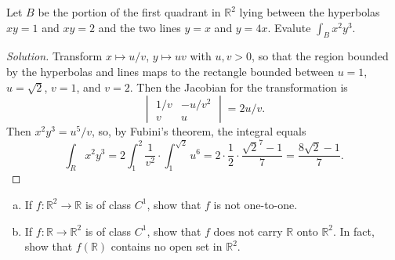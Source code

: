 \documentclass[10pt]{scrartcl}
\providecommand{\RR}{\mathbb R}
\providecommand{\ii}{\item}
\newenvironment{soln}{\begin{proof}[Solution]}{\end{proof}}
\begin{document}
\begin{problem}
	Let $B$ be the portion of the first quadrant in $\RR^2$ lying
	between the hyperbolas $xy=1$ and $xy=2$ and the two lines
	$y=x$ and $y=4x$.
	Evalute $\int_Bx^2y^3$.
\end{problem}

\begin{soln}
	Transform $x\mapsto u/v$, $y\mapsto uv$ with $u,v>0$, so that
	the region bounded by the hyperbolas and lines maps to
	the rectangle bounded between $u = 1$, $u = \sqrt2$,
	$v = 1$, and $v = 2$. Then the Jacobian for the transformation is
	\[\begin{vmatrix}
		1/v&-u/v^2\\v&u
	\end{vmatrix} = 2u/v.\]
	Then $x^2y^3 = u^5/v$, so, by Fubini's theorem, the integral equals
	\[\int_R x^2y^3 = 2\int_1^2 \frac{1}{v^2}\cdot \int_1^{\sqrt2} u^6
	= 2\cdot\frac{1}{2}\cdot \frac{\sqrt{2}^7 - 1}{7} = \frac{8\sqrt2-1}{7}.\]
\end{soln}

\begin{problem}
	\begin{enumerate}[(a)]
		\ii If $f\colon\RR^2\to\RR$ is of class $C^1$,
		show that $f$ is not one-to-one.
		\ii If $f\colon\RR\to\RR^2$ is of class $C^1$,
		show that $f$ does not carry $\RR$ onto $\RR^2$.
		In fact, show that $f(\RR)$ contains no open set in $\RR^2$.
	\end{enumerate}
\end{problem}
\end{document}

